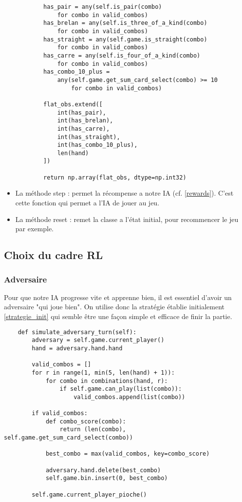 \documentclass[a4paper,12pt]{article}
\begin{document}
\begin{itemize}
\begin{verbatim}
        has_pair = any(self.is_pair(combo)
            for combo in valid_combos)
        has_brelan = any(self.is_three_of_a_kind(combo)
            for combo in valid_combos)
        has_straight = any(self.game.is_straight(combo)
            for combo in valid_combos)
        has_carre = any(self.is_four_of_a_kind(combo)
            for combo in valid_combos)
        has_combo_10_plus =
            any(self.game.get_sum_card_select(combo) >= 10
                for combo in valid_combos)

        flat_obs.extend([
            int(has_pair),
            int(has_brelan),
            int(has_carre),
            int(has_straight),
            int(has_combo_10_plus),
            len(hand)
        ])

        return np.array(flat_obs, dtype=np.int32)
\end{verbatim}

    \item La méthode step : permet la récompense a notre IA (cf. \ref{rewards}). C'est cette fonction qui permet a l'IA de jouer au jeu.
    
    \item La méthode reset : remet la classe a l'état initial, pour recommencer le jeu par exemple.
\end{itemize}

\subsection{Choix du cadre RL}

\subsubsection{Adversaire}

Pour que notre IA progresse vite et apprenne bien, il est essentiel d'avoir un adversaire "qui joue bien". On utilise donc la stratégie établie initialement \ref{strategie_init} qui semble être une façon simple et efficace de finir la partie.

\begin{verbatim}
    def simulate_adversary_turn(self):
        adversary = self.game.current_player()
        hand = adversary.hand.hand

        valid_combos = []
        for r in range(1, min(5, len(hand) + 1)):
            for combo in combinations(hand, r):
                if self.game.can_play(list(combo)):
                    valid_combos.append(list(combo))
        
        if valid_combos:
            def combo_score(combo):
                return (len(combo), self.game.get_sum_card_select(combo))

            best_combo = max(valid_combos, key=combo_score)

            adversary.hand.delete(best_combo)
            self.game.bin.insert(0, best_combo)

        self.game.current_player_pioche()
\end{verbatim}
\end{document}
